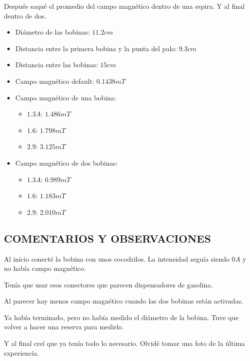 \documentclass[10pt, twoside]{article}
\begin{document}
Después saqué el promedio del campo magnético dentro de una espira.
Y al final dentro de dos.
\begin{itemize}
	\item Diámetro de las bobinas: $11.2cm$
	\item Distancia entre la primera bobina y la punta del palo: $9.3cm$
	\item Distancia entre las bobinas: $15cm$
	\item Campo magnético default: $0.1438mT$
	\item Campo magnético de una bobina:
		\begin{itemize}
			\item $1.3A$: $1.486mT$
			\item $1.6$: $1.798mT$
			\item $2.9$: $3.125mT$
		\end{itemize}
	\item Campo magnético de dos bobinas:
		\begin{itemize}
			\item $1.3A$: $0.989mT$
			\item $1.6$: $1.183mT$
			\item $2.9$: $2.010mT$
		\end{itemize}
\end{itemize}

\subsection{COMENTARIOS Y OBSERVACIONES}%

Al inicio conecté la bobina con unos cocodrilos.
La intensidad seguía siendo $0A$ y no había campo magnético.

Tenía que usar esos conectores que parecen dispensadores de gasolina.

Al parecer hay menos campo magnético cuando las dos bobinas
están activadas.

Ya había terminado, pero no había medido el diámetro de la bobina.
Tuve que volver a hacer una reserva para medirlo.

Y al final creí que ya tenía todo lo necesario.
Olvidé tomar una foto de la última experiencia.
\end{document}
